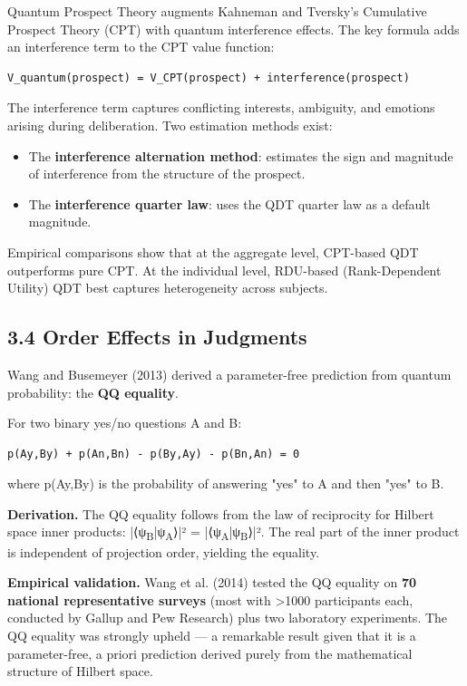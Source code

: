 \documentclass[11pt]{article}
\begin{document}
Quantum Prospect Theory augments Kahneman and Tversky's Cumulative Prospect
Theory (CPT) with quantum interference effects. The key formula adds an
interference term to the CPT value function:

\begin{verbatim}
V_quantum(prospect) = V_CPT(prospect) + interference(prospect)
\end{verbatim}

The interference term captures conflicting interests, ambiguity, and emotions
arising during deliberation. Two estimation methods exist:
\begin{itemize}
\item The \textbf{interference alternation method}: estimates the sign and magnitude of
interference from the structure of the prospect.
\item The \textbf{interference quarter law}: uses the QDT quarter law as a default
magnitude.
\end{itemize}

Empirical comparisons show that at the aggregate level, CPT-based QDT outperforms
pure CPT. At the individual level, RDU-based (Rank-Dependent Utility) QDT best
captures heterogeneity across subjects.
\subsection{3.4 Order Effects in Judgments}
\label{sec:org3ebc165}

Wang and Busemeyer (2013) derived a parameter-free prediction from quantum
probability: the \textbf{QQ equality}.

For two binary yes/no questions A and B:

\begin{verbatim}
p(Ay,By) + p(An,Bn) - p(By,Ay) - p(Bn,An) = 0
\end{verbatim}

where p(Ay,By) is the probability of answering "yes" to A and then "yes" to B.

\textbf{Derivation.} The QQ equality follows from the law of reciprocity for Hilbert
space inner products: |⟨ψ\textsubscript{B}|ψ\textsubscript{A}⟩|² = |⟨ψ\textsubscript{A}|ψ\textsubscript{B}⟩|². The real part of the inner
product is independent of projection order, yielding the equality.

\textbf{Empirical validation.} Wang et al. (2014) tested the QQ equality on \textbf{70 national
representative surveys} (most with >1000 participants each, conducted by Gallup
and Pew Research) plus two laboratory experiments. The QQ equality was strongly
upheld --- a remarkable result given that it is a parameter-free, a priori
prediction derived purely from the mathematical structure of Hilbert space.
\end{document}
